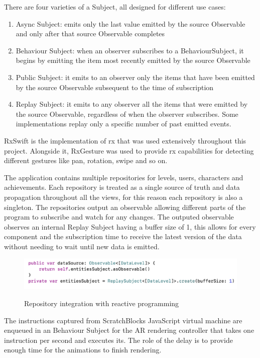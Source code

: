 \documentclass[12 pct]{report}
\begin{document}
There are four varieties of a Subject, all designed for different use cases:
\begin{enumerate}
\item Async Subject: emits only the last value emitted by the source Observable and only after that source Observable completes
\item Behaviour Subject: when an observer subscribes to a BehaviourSubject, it begins by emitting the item most recently emitted by the source Observable
\item Public Subject: it emits to an observer only the items that have been emitted by the source Observable subsequent to the time of subscription
\item Replay Subject: it emits to any observer all the items that were emitted by the source Observable, regardless of when the observer subscribes. Some implementations replay only a specific number of past emitted events.
\end{enumerate}

RxSwift is the implementation of rx that was used extensively throughout this project. Alongside it, RxGesture was used to provide rx capabilities for detecting different gestures like pan, rotation, swipe and so on.

The application contains multiple repositories for levels, users, characters and achievements. Each repository is treated as a single source of truth and data propagation throughout all the views, for this reason each repository is also a singleton. The repositories output an observable allowing different parts of the program to subscribe and watch for any changes. The outputed observable observes an internal Replay Subject having a buffer size of 1, this allows for every component and the subscription time to receive the latest version of the data without needing to wait until new data is emitted.
\begin{figure}[H]
\includegraphics[width=1.0\textwidth]{reactive-repository}
\centering
\label{fig:reactive-repository}
\caption{Repository integration with reactive programming }
\end{figure}

The instructions captured from ScratchBlocks JavaScript virtual machine are enqueued in an Behaviour Subject for the AR rendering controller that takes one instruction per second and executes its. The role of the delay is to provide enough time for the animations to finish rendering. 
\end{document}
